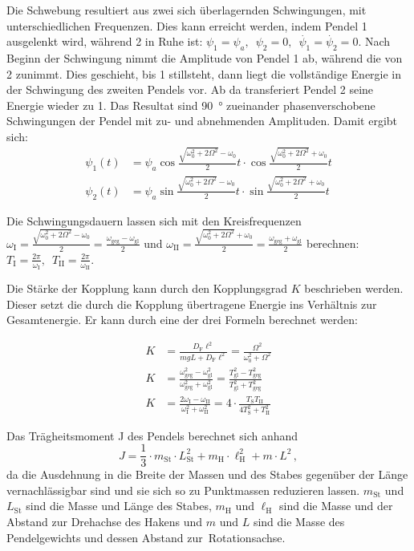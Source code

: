 \documentclass[
12pt,
a4paper,
bibliography=totocnumbered, %
BCOR=1cm, %
oneside, %
]{scrartcl}
\newcommand{\lh}{\ell_{\mathrm{H}}}
\begin{document}
Die Schwebung resultiert aus zwei sich überlagernden Schwingungen, mit unterschiedlichen Frequenzen. Dies kann erreicht werden, indem Pendel 1 ausgelenkt wird, während 2 in Ruhe ist: \(\psi_1 = \psi_a, \enspace \psi_2 = 0, \enspace \dot{\psi_1} = \dot{\psi_2} = 0\). Nach Beginn der Schwingung nimmt die Amplitude von Pendel 1 ab, während die von 2 zunimmt. Dies geschieht, bis 1 stillsteht, dann liegt die vollständige Energie in der Schwingung des zweiten Pendels vor. Ab da transferiert Pendel 2 seine Energie wieder zu 1. Das Resultat sind \qty{90}{\degree} zueinander phasenverschobene Schwingungen der Pendel mit zu- und abnehmenden Amplituden. Damit ergibt sich:
\begin{align}
	\psi_1(t) &= \psi_a\cos\frac{\sqrt{\omega_0^2+2\Omega^2}-\omega_0}{2}t\cdot\cos\frac{\sqrt{\omega_0^2+2\Omega^2}+\omega_0}{2}t\\
	\psi_2(t) &= \psi_a\sin\frac{\sqrt{\omega_0^2+2\Omega^2}-\omega_0}{2}t\cdot\sin\frac{\sqrt{\omega_0^2+2\Omega^2}+\omega_0}{2}t
\end{align}

Die Schwingungsdauern lassen sich mit den Kreisfrequenzen \(\omega_{\text{I}} = \frac{\sqrt{\omega_0^2 + 2\Omega^2} - \omega_0}{2} = \frac{\omega_{\text{geg}} - \omega_{\text{gl}}}{2}\) und \(\omega_{\text{II}} = \frac{\sqrt{\omega_0^2 + 2\Omega^2} + \omega_0}{2} = \frac{\omega_{\text{geg}} + \omega_{\text{gl}}}{2}\) berechnen: \(T_{\text{I}}=\frac{2\pi}{\omega_{\text{I}}}, \enspace T_{\text{II}} = \frac{2\pi}{\omega_{\text{II}}} \label{eq:t2}\).

Die Stärke der Kopplung kann durch den Kopplungsgrad \(K\) beschrieben werden. Dieser setzt die durch die Kopplung übertragene Energie ins Verhältnis zur Gesamtenergie. Er kann durch eine der drei Formeln berechnet werden:

\begin{align}
	K &= \frac{D_{\text{F}} \ell^2}{mgL + D_{\text{F}} \ell^2} = \frac{\Omega^2}{\omega_0^2 + \Omega^2}\\
	K &= \frac{\omega_{\text{geg}}^2 - \omega_{\text{gl}}^2}{\omega_{\text{geg}}^2 + \omega_{\text{gl}}^2} = \frac{T_{\text{gl}}^2 - T_{\text{geg}}^2}{T_{\text{gl}}^2 + T_{\text{geg}}^2}\\
	K &= \frac{2\omega_{\text{I}} - \omega_{\text{II}}}{\omega_{\text{I}}^2 + \omega_{\text{II}}^2} = 4\cdot\frac{T_{\text{S}} T_{\text{II}}}{4T_{\text{S}}^2 + T_{\text{II}}^2}
\end{align}

Das Trägheitsmoment J des Pendels berechnet sich anhand
\begin{equation}\label{eq:trägheitsmom}
	J=\frac{1}{3} \cdot m_{\text{St}} \cdot L_{\text{St}}^2 + m_{\text{H}} \cdot \lh^2 + m \cdot L^2 \,,
\end{equation}
da die Ausdehnung in die Breite der Massen und des Stabes gegenüber der Länge vernachlässigbar sind und sie sich so zu Punktmassen reduzieren lassen. \(m_{\text{St}}\) und \(L_{\text{St}}\) sind die Masse und Länge des Stabes, \(m_{\text{H}}\) und \(\lh\) sind die Masse und der Abstand zur Drehachse des Hakens und \(m\) und \(L\) sind die Masse des Pendelgewichts und dessen Abstand zur Rotationsachse.
\end{document}
